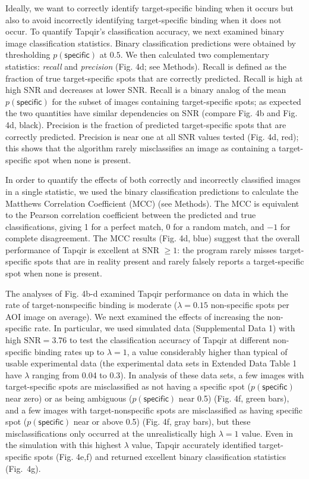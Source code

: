 Ideally, we want to correctly identify target-specific binding when it occurs but also to avoid incorrectly identifying target-specific binding when it does not occur. To quantify Tapqir's classification accuracy, we next examined binary image classification statistics. Binary classification predictions were obtained by thresholding $p(\mathsf{specific})$ at $0.5$. We then calculated two complementary statistics: \textit{recall} and \textit{precision} \cite{Fawcett2006-bq} (Fig. 4d; see Methods). Recall is defined as the fraction of true target-specific spots that are correctly predicted. Recall is high at high SNR and decreases at lower SNR. Recall is a binary analog of the mean $p(\mathsf{specific})$ for the subset of images containing target-specific spots; as expected the two quantities have similar dependencies on SNR (compare Fig. 4b and Fig. 4d, black). Precision is the fraction of predicted target-specific spots that are correctly predicted. Precision is near one at all SNR values tested (Fig. 4d, red); this shows that the algorithm rarely misclassifies an image as containing a target-specific spot when none is present. 

In order to quantify the effects of both correctly and incorrectly classified images in a single statistic, we used the binary classification predictions to calculate the Matthews Correlation Coefficient (MCC) \cite{Matthews1975-rw} (see Methods). The MCC is equivalent to the Pearson correlation coefficient between the predicted and true classifications, giving 1 for a perfect match, 0 for a random match, and $-1$ for complete disagreement. The MCC results (Fig. 4d, blue) suggest that the overall performance of Tapqir is excellent at SNR $\ge 1$: the program rarely misses target-specific spots that are in reality present and rarely falsely reports a target-specific spot when none is present.  

The analyses of Fig. 4b-d examined Tapqir performance on data in which the rate of target-nonspecific binding is moderate ($\lambda = 0.15$ non-specific spots per AOI image on average).  We next examined the effects of increasing the non-specific rate.  In particular, we used simulated data (Supplemental Data 1) with high $\mathrm{SNR} = 3.76$ to test the classification accuracy of Tapqir at different non-specific binding rates up to $\lambda = 1$, a value considerably higher than typical of usable experimental data (the experimental data sets in Extended Data Table 1 have $\lambda$ ranging from 0.04 to 0.3).   In analysis of these data sets, a few images with target-specific spots are misclassified as not having a specific spot ($p(\mathsf{specific})$ near zero) or as being ambiguous ($p(\mathsf{specific})$ near 0.5) (Fig. 4f, green bars), and a few images with target-nonspecific spots are misclassified as having specific spot ($p(\mathsf{specific})$ near or above 0.5) (Fig. 4f, gray bars), but these misclassifications only occurred at the unrealistically high $\lambda = 1$ value.  Even in the simulation with this highest $\lambda$ value, Tapqir accurately identified target-specific spots (Fig. 4e,f) and returned excellent binary classification statistics (Fig.~4g). 

